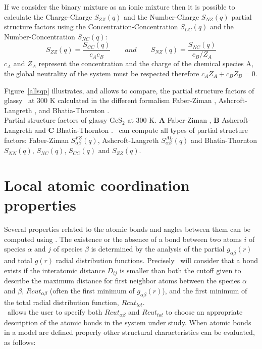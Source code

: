 \noindent If we consider the binary mixture as an ionic mixture then it is possible to calculate the Charge-Charge $S_{ZZ}(q)$ and the Number-Charge $S_{NZ}(q)$ partial structure factors using the Concentration-Concentration $S_{CC}(q)$ and the Number-Concentration $S_{NC}(q)$:
\begin{equation}
\label{sqp8}
S_{ZZ}(q) = \frac{S_{CC}(q)}{c_A c_B}  \qquad and \qquad S_{NZ}(q) = \frac{S_{NC}(q)}{c_B/Z_A}
\end{equation}
$c_A$ and $Z_A$ represent the concentration and the charge of the chemical species A, the global neutrality of the system must be respected therefore $c_AZ_A + c_BZ_B=0$. \\
\par
\noindent 
Figure~\ref{allsqp} illustrates, and allows to compare, the partial structure factors of glassy \ges\ at 300 K calculated in the different formalism Faber-Ziman \cite{PhilMag.11.153}, Ashcroft-Langreth \cite{PhysRev.156.685,PhysRev.159.500,PhysRev.166.934.2}, and Bhatia-Thornton \cite{PhysRevB.2.3004}. \\ 
{Partial structure factors of glassy GeS$_2$ at 300 K. {\bf{A}} Faber-Ziman \cite{PhilMag.11.153}, {\bf{B}} Ashcroft-Langreth \cite{PhysRev.156.685,PhysRev.159.500,PhysRev.166.934.2} and {\bf{C}} Bhatia-Thornton \cite{PhysRevB.2.3004}.}
\laf \atomes\ can compute all types of partial structure factors: Faber-Ziman $S^{FZ}_{\alpha \beta}(q)$, Ashcroft-Langreth $S^{AL}_{\alpha \beta}(q)$ and Bhatia-Thornton $S_{NN}(q)$, $S_{NC}(q)$, $S_{CC}(q)$ and $S_{ZZ}(q)$.
\clearpage
\section{Local atomic coordination properties}

Several properties related to the atomic bonds and angles between them can be computed using \atomes.
The existence or the absence of a bond between two atoms $i$ of species $\alpha$ and $j$ of species $\beta$ is determined by the analysis of the partial $g_{\alpha\beta}(r)$ and total $g(r)$ radial distribution functions. 
Precisely \atomes\ will consider that a bond exists if the interatomic distance $D_{ij}$ is smaller than both the cutoff given to describe the maximum distance for first neighbor atoms between the species $\alpha$ and $\beta$, 
$Rcut_{\alpha\beta}$ (often the first minimum of $g_{\alpha\beta}(r)$), 
and the first minimum of the total radial distribution function, $Rcut_{tot}$. \\
\atomes\ allows the user to specify both $Rcut_{\alpha\beta}$ and $Rcut_{tot}$ to choose an appropriate description of the atomic bonds in the system under study.
When atomic bonds in a model are defined properly other structural characteristics can be evaluated, as follows:

